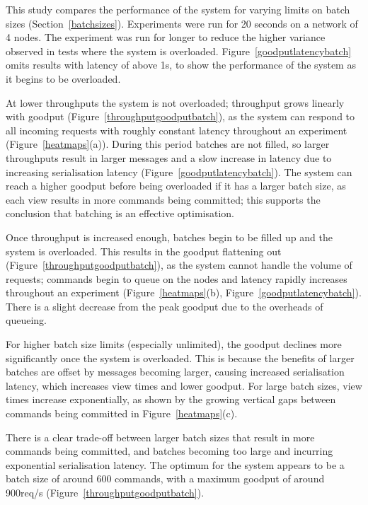 This study compares the performance of the system for varying limits on batch sizes (Section~\ref{batchsizes}). Experiments were run for 20 seconds on a network of 4 nodes. The experiment was run for longer to reduce the higher variance observed in tests where the system is overloaded. Figure~\ref{goodputlatencybatch} omits results with latency of above 1s, to show the performance of the system as it begins to be overloaded.

At lower throughputs the system is not overloaded; throughput grows linearly with goodput (Figure~\ref{throughputgoodputbatch}), as the system can respond to all incoming requests with roughly constant latency throughout an experiment (Figure~\ref{heatmaps}(a)). During this period batches are not filled, so larger throughputs result in larger messages and a slow increase in latency due to increasing serialisation latency (Figure~\ref{goodputlatencybatch}). The system can reach a higher goodput before being overloaded if it has a larger batch size, as each view results in more commands being committed; this supports the conclusion that batching is an effective optimisation.

Once throughput is increased enough, batches begin to be filled up and the system is overloaded. This results in the goodput flattening out (Figure~\ref{throughputgoodputbatch}), as the system cannot handle the volume of requests; commands begin to queue on the nodes and latency rapidly increases throughout an experiment (Figure~\ref{heatmaps}(b), Figure~\ref{goodputlatencybatch}). There is a slight decrease from the peak goodput due to the overheads of queueing.

For higher batch size limits (especially unlimited), the goodput declines more significantly once the system is overloaded. This is because the benefits of larger batches are offset by messages becoming larger, causing increased serialisation latency, which increases view times and lower goodput. For large batch sizes, view times increase exponentially, as shown by the growing vertical gaps between commands being committed in Figure~\ref{heatmaps}(c).

There is a clear trade-off between larger batch sizes that result in more commands being committed, and batches becoming too large and incurring exponential serialisation latency. The optimum for the system appears to be a batch size of around 600 commands, with a maximum goodput of around 900req/s (Figure~\ref{throughputgoodputbatch}).

